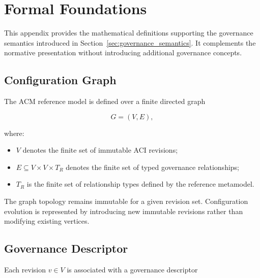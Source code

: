 \documentclass[10pt]{article}
\begin{document}
	
	
	
	
	
	
	
	
	
	
	
	
	
	
	
	
	
\appendices	
		
\section{Formal Foundations}
\label{appendix:formal_foundations}
	
	This appendix provides the mathematical definitions supporting the governance semantics introduced in Section~\ref{sec:governance_semantics}. It complements the normative presentation without introducing additional governance concepts.
	
	\subsection{Configuration Graph}
	
	The ACM reference model is defined over a finite directed graph
	
	\begin{equation}
		G=(V,E),
		\label{eq:graph_definition}
	\end{equation}
	
	where:
	
	\begin{itemize}
		\item $V$ denotes the finite set of immutable ACI revisions;
		\item $E\subseteq V\times V\times T_R$ denotes the finite set of typed governance relationships;
		\item $T_R$ is the finite set of relationship types defined by the reference metamodel.
	\end{itemize}
	
	The graph topology remains immutable for a given revision set. Configuration evolution is represented by introducing new immutable revisions rather than modifying existing vertices.
	
	\subsection{Governance Descriptor}
	
	Each revision $v\in V$ is associated with a governance descriptor
	
\end{document}
